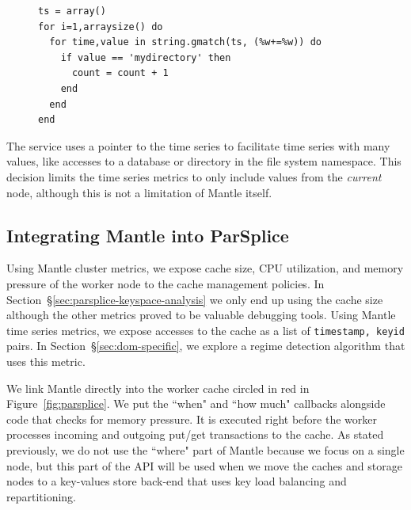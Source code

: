 \begin{figure}[h]
\footnotesize
\begin{verbatim}
ts = array()
for i=1,arraysize() do
  for time,value in string.gmatch(ts, (%w+=%w)) do
    if value == 'mydirectory' then
      count = count + 1
    end
  end
end
\end{verbatim}
\end{figure}

The service uses a pointer to the time series to facilitate time series with
many values, like accesses to a database or directory in the file system
namespace. This decision limits the time series metrics to only include values
from the {\it current } node, although this is not a limitation of Mantle
itself.

\subsection{Integrating Mantle into ParSplice}

Using Mantle cluster metrics, we expose cache size, CPU utilization, and memory
pressure of the worker node to the cache management policies. In
Section~\S\ref{sec:parsplice-keyspace-analysis} we only end up using the cache
size although the other metrics proved to be valuable debugging tools. Using
Mantle time series metrics, we expose accesses to the cache as a list of
\texttt{timestamp, keyid} pairs. In Section~\S\ref{sec:dom-specific}, we
explore a regime detection algorithm that uses this metric.

We link Mantle directly into the worker cache circled in red in
Figure~\ref{fig:parsplice}. We put the ``when" and ``how much" callbacks
alongside code that checks for memory pressure. It is executed right before the
worker processes incoming and outgoing put/get transactions to the cache. As
stated previously, we do not use the ``where" part of Mantle because we focus
on a single node, but this part of the API will be used when we move the caches
and storage nodes to a key-values store back-end that uses key load balancing and
repartitioning.
